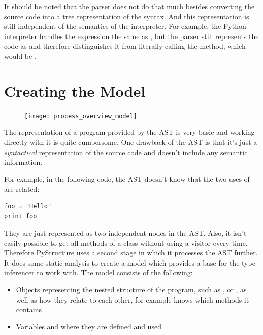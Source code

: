 \documentclass[12pt,halfparskip,DIV11,BCOR10mm]{scrreprt}
\begin{document}
It should be noted that the parser does not do that much besides converting the source code into a tree representation of the syntax. And this representation is still independent of the semantics of the interpreter. For example, the Python interpreter handles the expression  the same as , but the parser still represents the code as  and therefore distinguishes it from literally calling the  method, which would be .


\section{Creating the Model}
\label{creating_the_model}

\begin{figure}
    \vspace{-0.7cm}
    \texttt{[image: process\_overview\_model]}
    \vspace{-1cm}
\end{figure}

The representation of a program provided by the AST is very basic and working directly with it is quite cumbersome. 
One drawback of the AST is that it's just a \emph{syntactical} representation of the source code and doesn't include any semantic information.

For example, in the following code, the AST doesn't know that the two uses of  are related:

\begin{lstlisting}
foo = "Hello"
print foo
\end{lstlisting}

They are just represented as two independent  nodes in the AST. Also, it isn't easily possible to get all methods of a class without using a visitor every time. Therefore PyStructure uses a second stage in which it processes the AST further. It does some static analysis to create a model which provides a base for the type inferencer to work with. The model consists of the following:

\begin{itemize}
    \item Objects representing the nested structure of the program, such as ,  or , as well as how they relate to each other, for example  knows which methods it contains
    \item Variables and where they are defined and used
\end{itemize}
\end{document}
